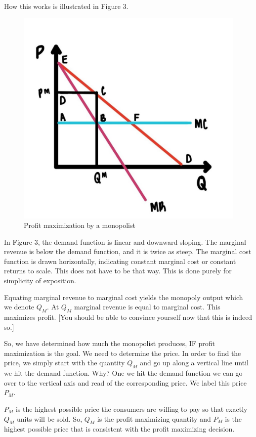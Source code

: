 \documentclass[
]{book}
\begin{document}
How this works is illustrated in Figure 3.

\begin{figure}

{\centering \includegraphics[width=0.75\linewidth]{img/ch6/fig3} 

}

\caption{Profit maximization by a monopolist}\label{fig:fig603}
\end{figure}

In Figure 3, the demand function is linear and downward sloping. The marginal revenue is below the demand function, and it is twice as steep. The marginal cost function is drawn horizontally, indicating constant marginal cost or constant returns to scale. This does not have to be that way. This is done purely for simplicity of exposition.

Equating marginal revenue to marginal cost yields the monopoly output which we denote \(Q_M\). At \(Q_M\) marginal revenue is equal to marginal cost. This maximizes profit. {[}You should be able to convince yourself now that this is indeed so.{]}

So, we have determined how much the monopolist produces, IF profit maximization is the goal. We need to determine the price. In order to find the price, we simply start with the quantity \(Q_M\) and go up along a vertical line until we hit the demand function. Why? One we hit the demand function we can go over to the vertical axis and read of the corresponding price. We label this price \(P_M\).

\(P_M\) is the highest possible price the consumers are willing to pay so that exactly \(Q_M\) units will be sold. So, \(Q_M\) is the profit maximizing quantity and \(P_M\) is the highest possible price that is consistent with the profit maximizing decision.
\end{document}
